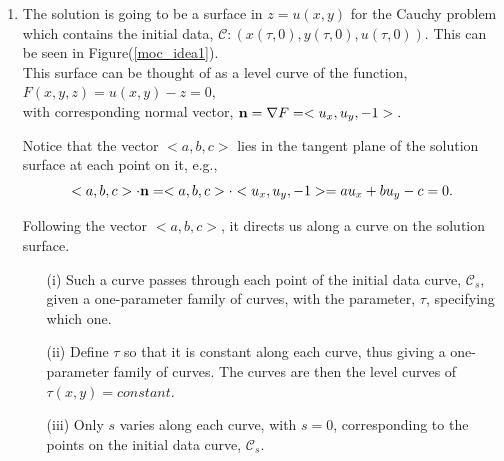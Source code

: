 \begin{enumerate}
\item The solution is going to be a surface in $z=u(x,y)$ for the Cauchy problem which contains the initial data, $\mathscr{C}: (x(\tau,0), y(\tau,0), u(\tau,0)).$ This can be seen in Figure(\ref{moc_idea1}).\\

This surface can be thought of as a level curve of the function, $F(x,y,z) = u(x,y)-z=0,$\\

with corresponding normal vector, ${\bf{n}} = \nabla F = <u_x,u_y,-1>.$

Notice that the vector $<a,b,c>$ lies in the tangent plane of the solution surface at each point on it, e.g., $$<a,b,c>\cdot {\bf{n}} = <a,b,c>\cdot<u_x,u_y,-1> = au_x + bu_y - c = 0.$$

Following the vector $<a,b,c>$, it directs us along a curve on the solution surface. 
\begin{itemize}
\item[(i)] Such a curve passes through each point of the initial data curve, $\mathscr{C}_s$, given a one-parameter family of curves, with the parameter, $\tau$, specifying which one. 
\item[(ii)] Define $\tau$ so that it is constant along each curve, thus giving a one-parameter family of curves.  The curves are then the level curves of $\tau(x,y)=constant$.
\item[(iii)] Only $s$ varies along each curve, with $s=0$, corresponding to the points on the initial data curve, $\mathscr{C}_s$.


\end{itemize}
\end{enumerate}
